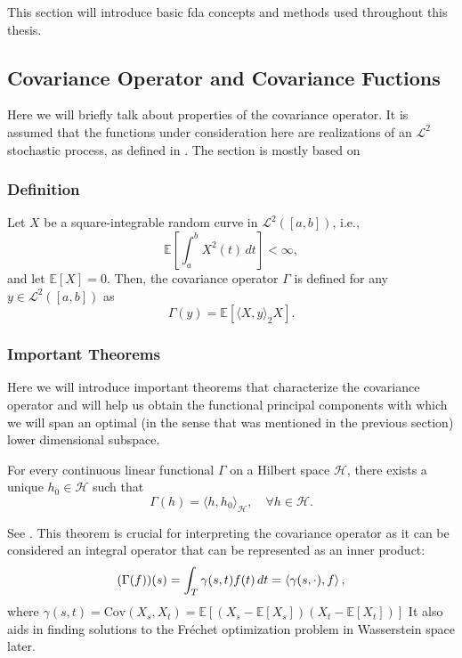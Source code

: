 This section will introduce basic fda concepts and methods used throughout this thesis.

\subsection{Covariance Operator and Covariance Fuctions}
\label{sec:covs}
Here we will briefly talk about properties of the covariance operator. It is assumed
that the functions under consideration here are realizations of an $\mathcal{L}^2$
stochastic process, as defined in \textcite[Chapter~1.1.2]{Ash1975}. The section is
mostly based on \textcite[Chapter~2]{HorvathKokoszka2012}

\subsubsection{Definition}
\label{sec:cov_def}

\begin{definition}
    \label{def:cov_operator}
    Let \( X \) be a square-integrable random curve in \( \mathcal{L}^2([a,b]) \), i.e., 
    \[
        \mathbb{E}\left[ \int_a^b X^2(t) \, dt \right] < \infty,
    \]
    and let \( \mathbb{E}[X] = 0 \). Then, the covariance operator \( \Gamma \) is defined for any \( y \in \mathcal{L}^2([a,b]) \) as
    \[
    \Gamma(y) = \mathbb{E}\left[ \langle X, y \rangle_{2} X \right].
    \]
\end{definition}
\subsubsection{Important Theorems}
\label{sec:theorems}
Here we will introduce important theorems that characterize the covariance operator
and will help us obtain the functional principal components with which we will span
an optimal (in the sense that was mentioned in the previous section) lower dimensional subspace.
\begin{theorem}
    \label{th:riesz}
    For every continuous linear functional \(\Gamma\) on a Hilbert space \(\mathcal{H}\), there
    exists a unique \(h_0 \in \mathcal{H}\) such that
    \[
        \Gamma(h) = \langle h, h_0 \rangle_{\mathcal{H}}, \quad \forall h \in \mathcal{H}.
    \]
\end{theorem}
See \Textcite[Chapter~1, \S 3]{Conway2007}. This theorem is crucial for interpreting the
covariance operator as it can be considered an integral operator that can be represented
as an inner product:
\begin{equation}
    (\Gamma(f))(s) = \int_{T} \gamma(s, t) f(t) \, dt = \left \langle \gamma(s, \cdot), f \right \rangle,
\end{equation}
where $\gamma(s, t) = \text{Cov}(X_s, X_t) = \mathbb{E}[(X_s - \mathbb{E}[X_s])(X_t - \mathbb{E}[X_t])]$
It also aids in finding solutions to the Fréchet optimization problem in Wasserstein space
later.

